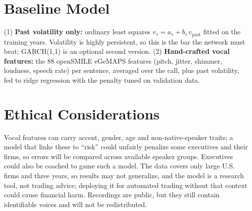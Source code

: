 \documentclass[final]{article}
\begin{document}
\section*{Baseline Model}
(1) \textbf{Past volatility only:} ordinary least squares $v_\tau = a_\tau + b_\tau\,v_{\text{past}}$
fitted on the training years. Volatility is highly persistent, so this is the bar the network must beat;
GARCH(1,1) \citep{bollerslev1986garch} is an optional second version.
(2) \textbf{Hand-crafted vocal features:} the 88 openSMILE eGeMAPS features (pitch, jitter, shimmer,
loudness, speech rate) per sentence, averaged over the call, plus past volatility, fed to ridge regression
with the penalty tuned on validation data.

\section*{Ethical Considerations}
Vocal features can carry accent, gender, age and non-native-speaker traits; a model that links these to
``risk'' could unfairly penalize some executives and their firms, so errors will be compared across
available speaker groups. Executives could also be coached to game such a model. The data covers only
large U.S. firms and three years, so results may not generalize, and the model is a research tool,
not trading advice; deploying it for automated trading without that context could cause financial harm.
Recordings are public, but they still contain identifiable voices and will not be redistributed.

\newpage


\end{document}
